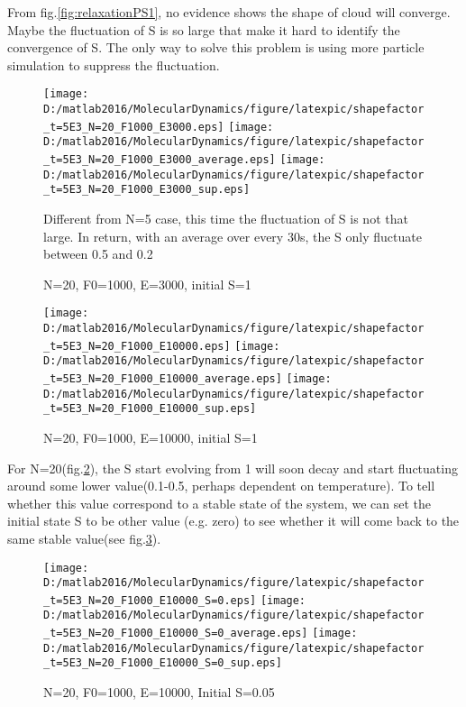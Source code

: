 \documentclass[aps,pre,twocolumn
,groupedaddress]{revtex4-1}
\begin{document}
From fig.\ref{fig:relaxationPS1}, no evidence shows the shape of cloud will converge. Maybe the fluctuation of S is so large that make it hard to identify the convergence of S. The only way to solve this problem is using more particle simulation to suppress the fluctuation.

\begin{figure}
\centering
\texttt{[image: D:/matlab2016/MolecularDynamics/figure/latexpic/shapefactor\_t=5E3\_N=20\_F1000\_E3000.eps]} 
\texttt{[image: D:/matlab2016/MolecularDynamics/figure/latexpic/shapefactor\_t=5E3\_N=20\_F1000\_E3000\_average.eps]}
\texttt{[image: D:/matlab2016/MolecularDynamics/figure/latexpic/shapefactor\_t=5E3\_N=20\_F1000\_E3000\_sup.eps]}
\caption{N=20, F0=1000, E=3000, initial S=1}
\begin{flushleft}
Different from N=5 case, this time the fluctuation of S is not that large. In return, with an average over every 30s, the S only fluctuate between 0.5 and 0.2
\end{flushleft}
\label{fig:relaxationPS2}
\end{figure}
\begin{figure}
\centering
\texttt{[image: D:/matlab2016/MolecularDynamics/figure/latexpic/shapefactor\_t=5E3\_N=20\_F1000\_E10000.eps]} 
\texttt{[image: D:/matlab2016/MolecularDynamics/figure/latexpic/shapefactor\_t=5E3\_N=20\_F1000\_E10000\_average.eps]}
\texttt{[image: D:/matlab2016/MolecularDynamics/figure/latexpic/shapefactor\_t=5E3\_N=20\_F1000\_E10000\_sup.eps]}
\caption{N=20, F0=1000, E=10000, initial S=1}
\label{fig:relaxationPS3}
\end{figure}

For N=20(fig.\ref{fig:relaxationPS3}), the S start evolving from 1 will soon decay and start fluctuating around some lower value(0.1-0.5, perhaps dependent on temperature). To tell whether this value correspond to a stable state of the system, we can set the initial state S to be other value (e.g. zero) to see whether it will come back to the same stable value(see fig.\ref{fig:relaxationPS4}).

\begin{figure}
\centering
\texttt{[image: D:/matlab2016/MolecularDynamics/figure/latexpic/shapefactor\_t=5E3\_N=20\_F1000\_E10000\_S=0.eps]} 
\texttt{[image: D:/matlab2016/MolecularDynamics/figure/latexpic/shapefactor\_t=5E3\_N=20\_F1000\_E10000\_S=0\_average.eps]}
\texttt{[image: D:/matlab2016/MolecularDynamics/figure/latexpic/shapefactor\_t=5E3\_N=20\_F1000\_E10000\_S=0\_sup.eps]}
\caption{N=20, F0=1000, E=10000, Initial S=0.05}
\label{fig:relaxationPS4}
\end{figure}
\end{document}
